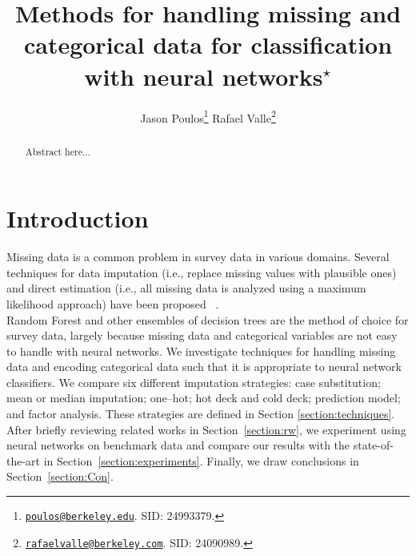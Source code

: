 \documentclass[10pt,twocolumn,letterpaper]{article}
\begin{document}
\title{Methods for handling missing and categorical data for classification with neural
networks$^\star$}

\author{
    Jason Poulos\thanks{\href{mailto:poulos@berkeley.edu}{\nolinkurl{poulos@berkeley.edu}}. SID: 24993379.}
    \hspace{10mm}
    Rafael Valle\thanks{\href{mailto:rafaelvalle@berkeley.com}{\nolinkurl{rafaelvalle@berkeley.com}}. SID: 24090989.}
    \vspace{15mm}
}

\maketitle

\begin{abstract}
Abstract here...
\end{abstract}



\section{Introduction} \label{section:Intro}

Missing data is a common problem in survey data in various domains. Several
techniques for data imputation (i.e., replace missing values with plausible ones) and
direct estimation (i.e., all missing data is analyzed using a maximum likelihood
approach) have been proposed ~\cite{de2003prevention}. \\

Random Forest and other ensembles of decision trees are the method of choice for survey data, largely because missing data and categorical variables are not easy to handle with neural networks. We investigate techniques for handling missing data and
encoding categorical data such that it is appropriate to neural network classifiers. We compare six different imputation strategies:  case substitution; mean or median imputation; one--hot; hot deck and cold deck; prediction model; and factor analysis. These strategies are defined in Section \ref{section:techniques}. \\

After briefly reviewing related works in Section~\ref{section:rw}, we experiment using neural networks on benchmark data and compare our results with the state-of-the-art in Section~\ref{section:experiments}. Finally, we draw conclusions in Section~\ref{section:Con}.
\end{document}
